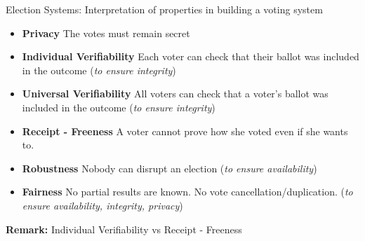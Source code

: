 \documentclass{beamer}
\begin{document}
\begin{frame}{Election Systems: Interpretation of properties in building a voting system}
\begin{itemize}
\item \textbf{Privacy} The votes must remain secret
\item \textbf{Individual Verifiability} Each voter can check that their ballot was included in the outcome (\textit{to ensure integrity})
\item \textbf{Universal Verifiability} All voters can check that a voter's ballot was included in the outcome (\textit{to ensure integrity})
\item \textbf{Receipt - Freeness} A voter cannot prove how she voted even if she wants to.
\item \textbf{Robustness} Nobody can disrupt an election (\textit{to ensure availability})
\item \textbf{Fairness} No partial results are known. No vote cancellation/duplication.  (\textit{to ensure availability, integrity, privacy})
\end{itemize}
\textbf{Remark: }Individual Verifiability vs Receipt - Freeness
\end{frame}
\end{document}
